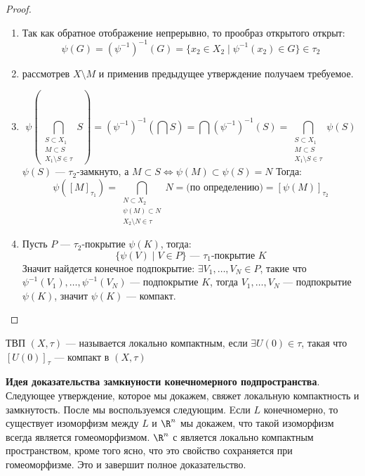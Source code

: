 \begin{proof}
	\begin{enumerate}
		\item Так как обратное отображение непрерывно, то прообраз открытого открыт:
		$$
		\psi(G) = (\psi^{-1})^{-1}(G) = \{x_2 \in X_2 \mid \psi^{-1}(x_2) \in G\} \in \tau_2
		$$
		\item рассмотрев $X \setminus M$ и применив предыдущее утверждение получаем требуемое.
		\item 
		$$
		\psi\left(\bigcap_{
			\substack{
				{S \subset X_1} \\
				 {M \subset S } \\
				 {X_1\setminus S \in \tau}
			}
		}S\right) = (\psi^{-1})^{-1}\left(\bigcap S\right) = \bigcap (\psi^{-1})^{-1}(S) = \bigcap_{\substack{S \subset X_1 \\ M \subset S \\ X_1\setminus S \in \tau}} \psi(S)
		$$
		$\psi(S)$ --- $\tau_2$-замкнуто, а $M \subset S \Leftrightarrow \psi(M) \subset \psi(S) = N$ Тогда:
		$$
		\psi\left([M]_{\tau_1}\right) = \bigcap_{\substack{N \subset X_2 \\ \psi(M) \subset N \\ X_2\setminus N \in \tau}}N = \text{(по определению)} = \left[\psi(M)\right]_{\tau_2}   
		$$
		\item Пусть $P$ --- $\tau_2$-покрытие $\psi(K)$, тогда:
		$$
		\{\psi(V) \mid V \in P \} \text{ --- $\tau_1$-покрытие $K$}
		$$
		Значит найдется конечное подпокрытие: $\exists V_1, \dots ,V_N \in P$, такие что $\psi^{-1}(V_1), \dots, \psi^{-1}(V_N)$ --- подпокрытие $K$, тогда $V_1, \dots,V_N$ --- подпокрытие $\psi(K)$, значит $\psi(K)$ --- компакт.
	\end{enumerate}
\end{proof}
\begin{definition}
	ТВП $(X, \tau)$ --- называется локально компактным, если $\exists U(0) \in \tau$, такая что $[U(0)]_\tau$ --- компакт в $(X, \tau)$
\end{definition}
\noindent \textbf{Идея доказательства замкнуности конечномерного подпространства}. \newline
Следующее утверждение, которое мы докажем, свяжет локальную компактность и замкнутость. После мы воспользуемся следующим. Eсли $L$ конечномерно, то существует изоморфизм между $L$ и $\R^n$ мы докажем, что такой изоморфизм всегда является гомеоморфизмом. $\R^n$ с  является локально компактным пространством, кроме того ясно, что это свойство сохраняется при гомеоморфизме. Это и завершит полное доказательство.
